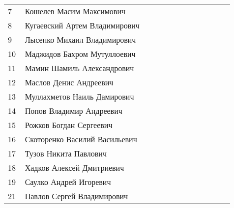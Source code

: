 \documentclass[a4paper,landscape,11pt]{article}
\newcommand*\ok{&{\small \ding{51}}} %
\newcommand*\no{&{\small }} %
\begin{document}
\begin{tabular}{p{7pt}|l|p{6pt}p{6pt}p{6pt}p{6pt}p{6pt}p{6pt}p{6pt}p{6pt}p{6pt}p{6pt}p{6pt}}
 7\,&Кошелев Масим Максимович          \no\no\no\no\no\no\no\no\no\ok\no\\
 8\,&Кугаевский Артем Владимирович     \ok\no\no\ok\ok\no\no\ok\ok\ok\no\\
 9\,&Лысенко Михаил Владимирович       \ok\ok\ok\ok\ok\ok\ok\ok\ok\ok\ok\\
10\,&Маджидов Бахром Мутуллоевич       \no\no\no\no\no\no\no\no\\
11\,&Мамин Шамиль Александрович        \ok\no\no\ok\ok\no\ok\ok\ok\ok\ok\\
\midrule
12\,&Маслов Денис Андреевич            \ok\ok\ok\ok\ok\no\no\ok\ok\ok\ok\\
13\,&Муллахметов Наиль Дамирович       \ok\ok\no\ok\no\no\ok\no\ok\ok\no\\
14\,&Попов Владимир Андреевич          \ok\ok\no\ok\ok\ok\ok\ok\ok\ok\no\\
15\,&Рожков Богдан Сергеевич           \no\no\no\no\no\no\no\no\\
16\,&Скоторенко Василий Васильевич     \ok\ok\ok\ok\ok\ok\ok\ok\ok\ok\ok\\
17\,&Тузов Никита Павлович             \ok\ok\ok\ok\ok\ok\ok\ok\ok\ok\ok\\
18\,&Хадков Алексей Дмитриевич         \ok\no\ok\ok\ok\ok\ok\ok\ok\ok\ok\\
19\,&Саулко Андрей Игоревич            \ok\no\no\ok\ok\no\no\ok\ok\ok\ok\\
21\,&Павлов Сергей Владимирович        \ok\ok\no\ok\no\no\no\ok\no\no\ok\\   
\bottomrule
\end{tabular} 
\newpage
%
\hspace{-3cm}
\end{document}
